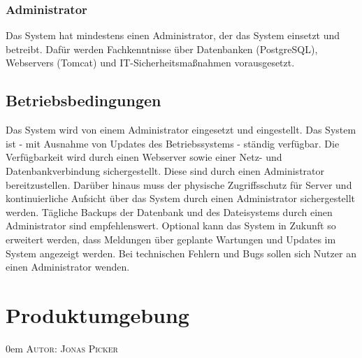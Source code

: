 \documentclass{article}
\makeatletter
\newcommand{\sectionauthor}[1]{
	{\parindent 0em \large \scshape Autor: #1 \par \nobreak \vspace*{2em}}
	\@afterheading
}
\makeatother
\begin{document}
\subsubsection{Administrator}
Das System hat mindestens einen Administrator, der das System einsetzt und betreibt. Dafür werden Fachkenntnisse über Datenbanken (PostgreSQL), Webservers (Tomcat) und \linebreak IT-Sicherheitsmaßnahmen vorausgesetzt.
\subsection{Betriebsbedingungen}
Das System wird von einem Administrator eingesetzt und eingestellt. Das System ist - mit Ausnahme von Updates des Betriebssystems - ständig verfügbar. Die Verfügbarkeit wird durch einen Webserver sowie einer Netz- und Datenbankverbindung sichergestellt. Diese sind durch einen Administrator bereitzustellen. Darüber hinaus muss der physische Zugriffsschutz für Server und kontinuierliche Aufsicht über das System durch einen Administrator sichergestellt werden. Tägliche Backups der Datenbank und des Dateisystems durch einen Administrator sind empfehlenswert. Optional kann das System in Zukunft so erweitert werden, dass Meldungen über geplante Wartungen und Updates im System angezeigt werden. Bei technischen Fehlern und Bugs sollen sich Nutzer an einen Administrator wenden.

\section{Produktumgebung} %
\sectionauthor{Jonas Picker}
\end{document}
